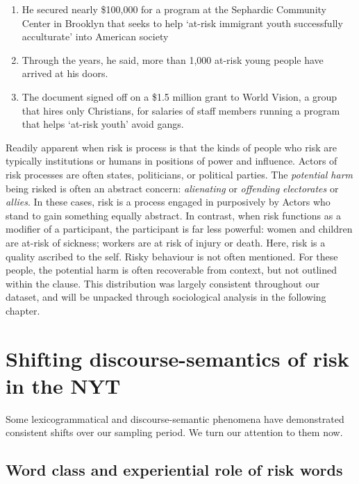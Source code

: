 \begin{enumerate}    [before=\itshape,font=\normalfont] \setlength\itemsep{0em} \small

\item He secured nearly \$100,000 for a program at the Sephardic Community Center in Brooklyn that seeks to help `at-risk immigrant youth successfully acculturate' into American society
\item Through the years, he said, more than 1,000 at-risk young people have arrived at his doors.
\item The document signed off on a \$1.5 million grant to World Vision, a group that hires only Christians, for salaries of staff members running a program that helps `at-risk youth' avoid gangs.
\end{enumerate}
%
Readily apparent when risk is process is that the kinds of people who risk are typically institutions or humans in positions of power and influence. Actors of risk processes are often states, politicians, or political parties. The \emph{potential harm} being risked is often an abstract concern: \emph{alienating} or \emph{offending} \emph{electorates} or \emph{allies}. In these cases, risk is a process engaged in purposively by Actors who stand to gain something equally abstract. In contrast, when risk functions as a modifier of a participant, the participant is far less powerful: women and children are at-risk of sickness; workers are at risk of injury or death. Here, risk is a quality ascribed to the self. Risky behaviour is not often mentioned. For these people, the potential harm is often recoverable from context, but not outlined within the clause. This distribution was largely consistent throughout our dataset, and will be unpacked through sociological analysis in the following chapter. %

\section{Shifting discourse-semantics of risk in the NYT}

Some lexicogrammatical and discourse-semantic phenomena have demonstrated consistent shifts over our sampling period. We turn our attention to them now.

\subsection{Word class and experiential role of risk words}

